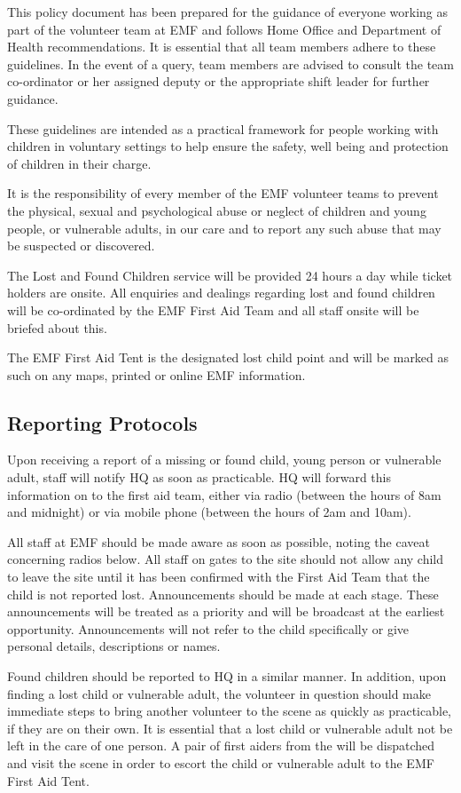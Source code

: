 This policy document has been prepared for the guidance of everyone working as
part of the volunteer team at EMF and follows Home Office and Department of
Health recommendations. It is essential that all team members adhere to these
guidelines. In the event of a query, team members are advised to consult the
team co-ordinator or her assigned deputy or the appropriate shift leader for
further guidance.

These guidelines are intended as a practical framework for people working with
children in voluntary settings to help ensure the safety, well being and
protection of children in their charge.

It is the responsibility of every member of the EMF volunteer teams to prevent
the physical, sexual and psychological abuse or neglect of children and young
people, or vulnerable adults, in our care and to report any such abuse that may
be suspected or discovered.

The Lost and Found Children service will be provided 24 hours a day while
ticket holders are onsite. All enquiries and dealings regarding lost and found
children will be co-ordinated by the EMF First Aid Team and all staff onsite
will be briefed about this.

The EMF First Aid Tent is the designated lost child point and will be marked as
such on any maps, printed or online EMF information.

\subsection{Reporting Protocols}

Upon receiving a report of a missing or found child, young person or vulnerable
adult, staff will notify HQ as soon as practicable. HQ will forward this
information on to the first aid team, either via radio (between the hours of
8am and midnight) or via mobile phone (between the hours of 2am and 10am).

All staff at EMF should be made aware as soon as possible, noting the
caveat concerning radios below. All staff on gates to the site should not allow
any child to leave the site until it has been confirmed with the First Aid Team
that the child is not reported lost. Announcements should be made at each
stage. These announcements will be treated as a priority and will be broadcast
at the earliest opportunity. Announcements will not refer to the child
specifically or give personal details, descriptions or names.

Found children should be reported to HQ in a similar manner. In addition, upon
finding a lost child or vulnerable adult, the volunteer in question should make
immediate steps to bring another volunteer to the scene as quickly as
practicable, if they are on their own. It is essential that a lost child or
vulnerable adult not be left in the care of one person. A pair of first aiders
from the will be dispatched and visit the scene in order to escort the child or
vulnerable adult to the EMF First Aid Tent.

